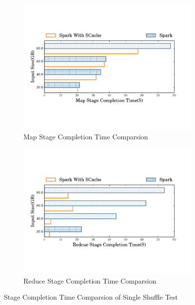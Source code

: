 \begin{figure}
	\begin{subfigure}{\linewidth}
		\centering
		\includegraphics[width=0.9\linewidth]{fig/groupbymapstage}
		\caption{Map Stage Completion Time Comparsion}
		\label{fig:mapstage}
	\end{subfigure}
	\begin{subfigure}{\linewidth}
		\centering
		\includegraphics[width=0.9\linewidth]{fig/groupbyreducestage}
		\caption{Reduce Stage Completion Time Comparsion}
		\label{fig:reducestage}
	\end{subfigure}
	\caption{Stage Completion Time Comparsion of Single Shuffle Test}
	\label{fig:singleshuffle}
\end{figure}
